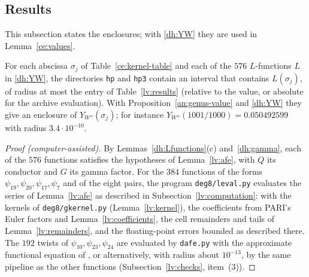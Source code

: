 \subsection{Results}\label{lv:results-section}
This subsection states the enclosures; with \eqref{dh:YW} they are used in
Lemma~\ref{ce:values}.

\begin{proposition}\label{lv:values}
For each abscissa $\sigma_j$ of Table~\ref{ce:kernel-table} and each of the
$576$ $L$-functions $L$ in \eqref{dh:YW}, the directories \texttt{hp} and
\texttt{hp3} contain an interval that contains $L(\sigma_j)$, of radius at
most the entry of Table~\ref{lv:results} (relative to the value, or absolute
for the archive evaluation). With Proposition~\ref{an:genus-value} and
\eqref{dh:YW} they give an enclosure of $Y_{W''}(\sigma_j)$; for instance
$Y_{W''}(1001/1000)=0.050492599$ with radius $3.4\cdot10^{-10}$.
\end{proposition}

\begin{proof}[Proof (computer-assisted)]
By Lemmas~\ref{dh:Lfunctions}(c) and~\ref{dh:gamma}, each of the $576$
functions satisfies the hypotheses of Lemma~\ref{lv:afe}, with $Q$ its
conductor and $G$ its gamma factor. For the $384$ functions of the forms
$\psi_{19},\psi_{20},\psi_{17},\psi_7$ and of the eight pairs, the program
\texttt{deg8/leval.py} evaluates the series of Lemma~\ref{lv:afe} as
described in Subsection~\ref{lv:computation}: with the kernels of
\texttt{deg8/gkernel.py} (Lemma~\ref{lv:kernel}), the coefficients from
PARI's Euler factors and Lemma~\ref{lv:coefficients}, the cell remainders and
tails of Lemma~\ref{lv:remainders}, and the floating-point errors bounded as
described there. The $192$ twists of $\psi_{10},\psi_{23},\psi_{24}$ are
evaluated by \texttt{dafe.py} with the approximate functional equation of
\cite[Lemma~4.4]{Naslund0418235}, or alternatively, with radius about
$10^{-13}$, by the same pipeline as the other functions
(Subsection~\ref{lv:checks}, item~(3)).
\end{proof}

